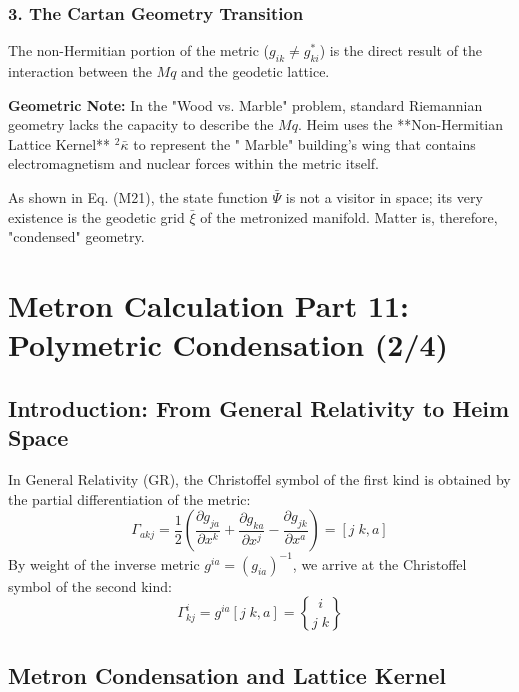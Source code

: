 \documentclass[11pt,a4paper,oneside]{article}
\newcommand{\christoffel}[2]{\genfrac{\{}{\}}{0pt}{}{#1}{#2}}
\begin{document}
\subsubsection*{3. The Cartan Geometry Transition}
The non-Hermitian portion of the metric ($g_{ik} \neq g_{ki}^*$) is the direct result of the interaction between the $Mq$ and the geodetic lattice. 
\begin{mbbcite}
    \textbf{Geometric Note:} In the "Wood vs. Marble" problem, standard Riemannian geometry lacks the capacity to describe the $Mq$. Heim uses the **Non-Hermitian Lattice Kernel** ${}^2 \bar{\kappa}$ to represent the " Marble" building's wing that contains electromagnetism and nuclear forces within the metric itself.
\end{mbbcite}
As shown in Eq. (M21), the state function $\bar{\Psi}$ is not a visitor in space; its very existence is the geodetic grid $\bar{\xi}$ of the metronized manifold. Matter is, therefore, "condensed" geometry. 
\section{Metron Calculation Part 11: Polymetric Condensation (2/4)}

\subsection{Introduction: From General Relativity to Heim Space}

In General Relativity (GR), the Christoffel symbol of the first kind is obtained by the partial differentiation of the metric:
\begin{equation}
    \Gamma_{akj} = \frac{1}{2} \left( \frac{\partial g_{ja}}{\partial x^{k}} + \frac{\partial g_{ka}}{\partial x^{j}} - \frac{\partial g_{jk}}{\partial x^{a}} \right) = [j\;k,a]
\end{equation}
By weight of the inverse metric $g^{ia} = (g_{ia})^{-1}$, we arrive at the Christoffel symbol of the second kind:
\begin{equation}
    \Gamma^i_{kj} = g^{ia} [j\;k,a] = \christoffel{i}{j\;k}
\end{equation}

\subsection{Metron Condensation and Lattice Kernel}
\end{document}
